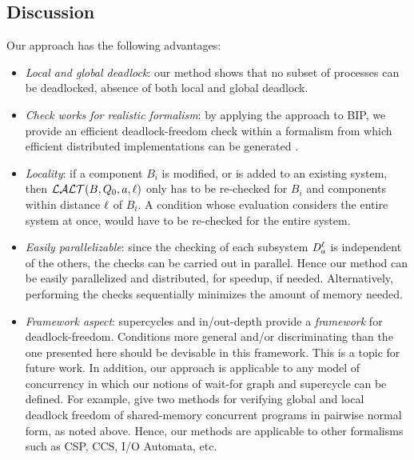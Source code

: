 


\subsection{Discussion}
Our approach has the following advantages:
\begin{itemize}

\item \emph{Local and global deadlock}: our method shows that no subset of processes
  can be deadlocked, \ie absence of both local and global deadlock. 

\item \emph{Check works for realistic formalism}:  by applying the approach to BIP, we
provide an efficient deadlock-freedom check within a formalism from
which efficient distributed implementations can be generated
\cite{BonakdarpourBJQS10b}.  

\item \emph{Locality}: if a component $B_i$ is modified, or is added to an
  existing system, then $\mathcal{LALT}(B, Q_0, a, \ell)$ only has to
  be re-checked for $B_i$ and components within distance $\ell$ of $B_i$.
  A condition whose evaluation considers the entire
  system at once, \eg \cite{AB03,DFinder2,GS03}
  would have to be re-checked for the entire system. 

\item \emph{Easily parallelizable}: since the checking of each subsystem $\mathit{D}_{a}^{\ell}$
  is independent of the others, the checks can be carried out in parallel. Hence
  our method can be easily parallelized and distributed, for speedup, if needed.
  Alternatively, performing the checks sequentially
  minimizes the amount of memory needed. 

\item \emph{Framework aspect}: supercycles and in/out-depth provide a \emph{framework} for
  deadlock-freedom. Conditions more general and/or discriminating than
  the one presented here 
  should be devisable in this framework. This is a topic for future work.
In addition, our approach is applicable to any model of concurrency in
which our notions of wait-for graph and supercycle can be defined. For example,  
give two methods for verifying global
and local deadlock freedom of shared-memory concurrent programs in pairwise normal form, as noted above.
Hence, our methods are applicable to other formalisms such as CSP, CCS, I/O Automata, etc.


\end{itemize}


